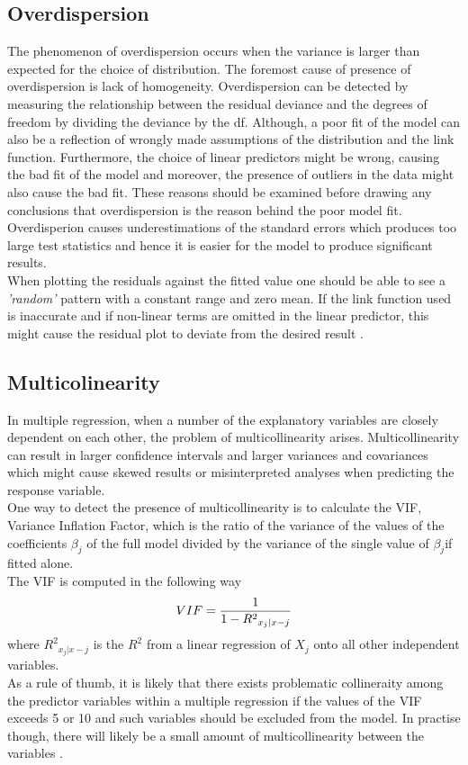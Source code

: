 \subsection{ Overdispersion}
The phenomenon of overdispersion occurs when the variance is larger than expected for the choice of distribution. The foremost cause of presence of overdispersion is lack of homogeneity. Overdispersion can be detected by measuring the relationship between the residual deviance and the degrees of freedom by dividing the deviance by the df. Although, a poor fit of the model can also be a reflection of wrongly made assumptions of the distribution and the link function. Furthermore, the choice of linear predictors might be wrong, causing the bad fit of the model and moreover, the presence of outliers in the data might also cause the bad fit. These reasons should be examined before drawing any conclusions that overdispersion is the reason behind  the poor model fit. Overdisperion causes underestimations of the standard errors which produces too large test statistics and hence it is easier for the model to produce significant results.\\
When plotting the residuals against the fitted value one should be able to see a \textit{'random'} pattern with a constant range and zero mean. If the link function used is inaccurate and if non-linear terms are omitted in the linear predictor, this might cause the residual plot to deviate from the desired result \citet{berndtsson2002planning}. 
\subsection{Multicolinearity}
In multiple regression, when a number of the explanatory variables are closely dependent on each other, the problem of multicollinearity arises. Multicollinearity can result in larger confidence intervals and larger variances and covariances which might cause skewed results or misinterpreted analyses when predicting the response variable.\\
One way to detect the presence of multicollinearity is to calculate the VIF, Variance Inflation Factor, which is the ratio of the variance of the values of the coefficients $\beta_{j}$ of the full model divided by the variance of the single value of $\beta_{j}$if fitted alone.\\
The VIF is computed in the following way
\begin{equation}
	\centering
	VIF=\frac{1}{1 - {R^{2}}_{x_{j}|x-j}}	
\end{equation}
where ${R^{2}}_{x_{j}|x-j}$ is the $R^2$ from a linear regression of $X_j$ onto all other independent variables.\\
As a rule of thumb, it is likely that there exists problematic collineraity among the predictor variables within a multiple regression if the values of the VIF exceeds 5 or 10 and such variables should be excluded from the model. In practise though, there will likely be a small amount of multicollinearity between the variables \citet{james2013introduction}.
